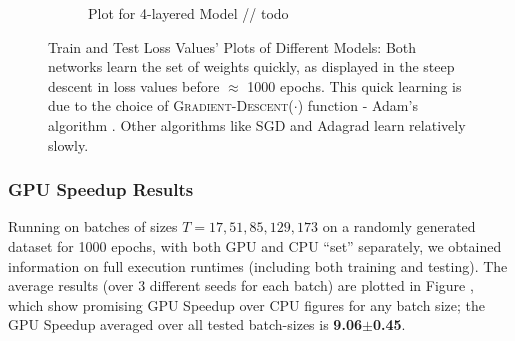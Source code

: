 \documentclass[12pt]{article}
\begin{document}
\begin{figure}[!htbp]
\begin{subfigure}{.49\textwidth}
            \caption{Plot for 4-layered Model // todo}
            \label{fig:Plot for 4-layered Model}
        \end{subfigure}
        \caption[Train and Test Loss Values' Plots of Different Models]{Train and Test Loss Values' Plots of Different Models: Both networks learn the set of weights quickly, as displayed in the steep descent in loss values before $\approx$ 1000 epochs. This quick learning is due to the choice of \textsc{Gradient-Descent}($\cdot$) function - Adam's algorithm \cite{Adam}. Other algorithms like SGD \cite{SGD} and Adagrad \cite{Adagrad} learn relatively slowly.}
        \label{fig:Train & Test Loss Values' Plots of Different Models}
    \end{figure}

    \subsubsection{GPU Speedup Results} \label{sec:IdProbRes - GPU}
    Running on batches of sizes $T = 17, 51, 85, 129, 173$ on a randomly generated dataset for 1000 epochs, with both GPU and CPU ``set'' separately, we obtained information on full execution runtimes (including both training and testing). The average results (over 3 different seeds for each batch) are plotted in Figure , which show promising GPU Speedup over CPU figures for any batch size; the GPU Speedup averaged over all tested batch-sizes is \textbf{9.06$\pm$0.45}.
\end{document}
